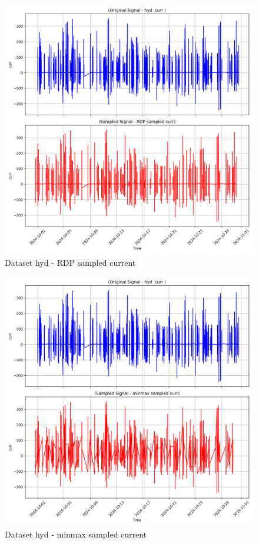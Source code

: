 \begin{figure}
    \centering
    \includegraphics[width=1\linewidth]{screenshots/hyd/RDP_sampled_curr_screenshot.png}
    \caption{Dataset hyd - RDP sampled current }
    \label{fig:hyd_RDP_sampled_curr_screenshot}
\end{figure}
\begin{figure}
    \centering
    \includegraphics[width=1\linewidth]{screenshots/hyd/minmax_sampled_curr_screenshot.png}
    \caption{Dataset hyd - minmax sampled current }
    \label{fig:hyd_minmax_sampled_curr_screenshot}
\end{figure}
